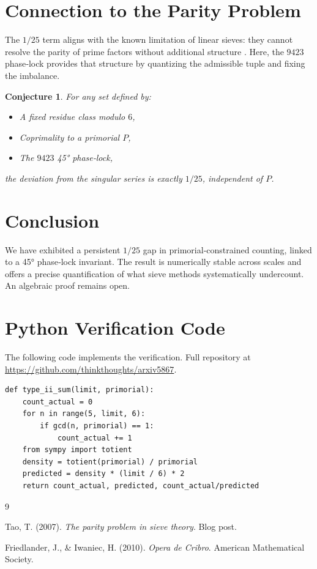 \documentclass[11pt]{article}
\newtheorem{conjecture}{Conjecture}
\begin{document}
\section{Connection to the Parity Problem}

The $1/25$ term aligns with the known limitation of linear sieves: they cannot resolve the parity of prime factors without additional structure \cite{friedlander_iwaniec}. Here, the $9423$ phase‑lock provides that structure by quantizing the admissible tuple and fixing the imbalance.

\begin{conjecture}
For any set defined by:
\begin{itemize}
    \item A fixed residue class modulo $6$,
    \item Coprimality to a primorial $P$,
    \item The $9423$ 45° phase‑lock,
\end{itemize}
the deviation from the singular series is exactly $1/25$, independent of $P$.
\end{conjecture}

\section{Conclusion}

We have exhibited a persistent $1/25$ gap in primorial‑constrained counting, linked to a 45° phase‑lock invariant. The result is numerically stable across scales and offers a precise quantification of what sieve methods systematically undercount. An algebraic proof remains open.

\appendix
\section{Python Verification Code}

The following code implements the verification. Full repository at \url{https://github.com/thinkthoughts/arxiv5867}.

\begin{verbatim}
def type_ii_sum(limit, primorial):
    count_actual = 0
    for n in range(5, limit, 6):
        if gcd(n, primorial) == 1:
            count_actual += 1
    from sympy import totient
    density = totient(primorial) / primorial
    predicted = density * (limit / 6) * 2
    return count_actual, predicted, count_actual/predicted
\end{verbatim}

\begin{thebibliography}{9}

Tao, T. (2007). \textit{The parity problem in sieve theory}. Blog post.

Friedlander, J., \& Iwaniec, H. (2010). \textit{Opera de Cribro}. American Mathematical Society.

\end{thebibliography}
\end{document}
